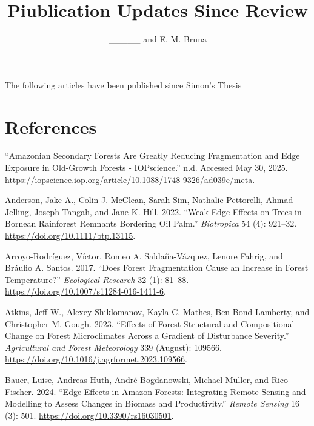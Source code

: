 \documentclass[
  12pt,
]{article}
\title{Piublication Updates Since Review}
\author{\_\_\_\_\_ and E. M. Bruna}
\date{}
\newlength{\cslhangindent}
\newenvironment{CSLReferences}[2] %
 {\begin{list}{}{%
  \setlength{\itemindent}{0pt}
  \setlength{\leftmargin}{0pt}
  \setlength{\parsep}{0pt}
  \ifodd #1
   \setlength{\leftmargin}{\cslhangindent}
   \setlength{\itemindent}{-1\cslhangindent}
  \fi
  \setlength{\itemsep}{#2\baselineskip}}}
 {\end{list}}
\begin{document}
\maketitle

The following articles have been published since Simon's Thesis

\section*{References}\label{references}

\label{refs}
\begin{CSLReferences}{1}{0}
{``Amazonian Secondary Forests Are Greatly Reducing Fragmentation and
Edge Exposure in Old-Growth Forests - {IOPscience}.''} n.d. Accessed May
30, 2025.
\url{https://iopscience.iop.org/article/10.1088/1748-9326/ad039e/meta}.

Anderson, Jake A., Colin J. McClean, Sarah Sim, Nathalie Pettorelli,
Ahmad Jelling, Joseph Tangah, and Jane K. Hill. 2022. {``Weak Edge
Effects on Trees in {Bornean} Rainforest Remnants Bordering Oil Palm.''}
\emph{Biotropica} 54 (4): 921--32.
\url{https://doi.org/10.1111/btp.13115}.

Arroyo-Rodríguez, Víctor, Romeo A. Saldaña-Vázquez, Lenore Fahrig, and
Bráulio A. Santos. 2017. {``Does Forest Fragmentation Cause an Increase
in Forest Temperature?''} \emph{Ecological Research} 32 (1): 81--88.
\url{https://doi.org/10.1007/s11284-016-1411-6}.

Atkins, Jeff W., Alexey Shiklomanov, Kayla C. Mathes, Ben Bond-Lamberty,
and Christopher M. Gough. 2023. {``Effects of Forest Structural and
Compositional Change on Forest Microclimates Across a Gradient of
Disturbance Severity.''} \emph{Agricultural and Forest Meteorology} 339
(August): 109566. \url{https://doi.org/10.1016/j.agrformet.2023.109566}.

Bauer, Luise, Andreas Huth, André Bogdanowski, Michael Müller, and Rico
Fischer. 2024. {``Edge {Effects} in {Amazon} {Forests}: {Integrating}
{Remote} {Sensing} and {Modelling} to {Assess} {Changes} in {Biomass}
and {Productivity}.''} \emph{Remote Sensing} 16 (3): 501.
\url{https://doi.org/10.3390/rs16030501}.


\end{CSLReferences}
\end{document}
